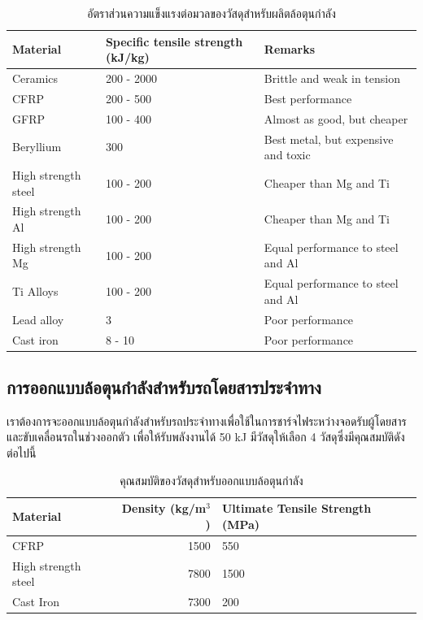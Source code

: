 \documentclass[a4paper,nobib,openany]{tufte-book}
\begin{document}
\begin{table}[htbp]
\caption{อัตราส่วนความแข็งแรงต่อมวลของวัสดุสำหรับผลิตล้อตุนกำลัง}
\centering
\begin{tabular}{p{2.5cm}p{3cm}p{3.5cm}}
\toprule
Material & Specific tensile strength (kJ/kg) & Remarks\\
\midrule
Ceramics & 200 - 2000 & Brittle and weak in tension\\
CFRP & 200 - 500 & Best performance\\
GFRP & 100 - 400 & Almost as good, but cheaper\\
Beryllium & 300 & Best metal, but expensive and toxic\\
High strength steel & 100 - 200 & Cheaper than Mg and Ti\\
High strength Al & 100 - 200 & Cheaper than Mg and Ti\\
High strength Mg & 100 - 200 & Equal performance to steel and Al\\
Ti Alloys & 100 - 200 & Equal performance to steel and Al\\
Lead alloy & 3 & Poor performance\\
Cast iron & 8 - 10 & Poor performance\\
\bottomrule
\end{tabular}
\end{table}

\subsection{การออกแบบล้อตุนกำลังสำหรับรถโดยสารประจำทาง}
\label{sec:orge577350}

เราต้องการจะออกแบบล้อตุนกำลังสำหรับรถประจำทางเพื่อใช้ในการชาร์จไฟระหว่างจอดรับผู้โดยสาร
และขับเคลื่อนรถในช่วงออกตัว เพื่อให้รับพลังงานได้ 50 kJ มีวัสดุให้เลือก
4 วัสดุซึ่งมีคุณสมบัติดังต่อไปนี้

\begin{table}[htbp]
\caption{คุณสมบัติของวัสดุสำหรับออกแบบล้อตุนกำลัง}
\centering
\begin{tabular}{lrp{3cm}}
\toprule
Material & Density (kg/m\(^{\text{3}}\)) & Ultimate Tensile Strength (MPa)\\
\midrule
CFRP & 1500 & 550\\
High strength steel & 7800 & 1500\\
Cast Iron & 7300 & 200\\
\bottomrule
\end{tabular}
\end{table}
\end{document}
